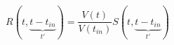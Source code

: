 \begin{equation}
R(t,\underbrace{t-t_{in}}_{t'})=\frac{V(t)}{V(t_{in})} S(t,\underbrace{t-t_{in}}_{t'})
\end{equation}